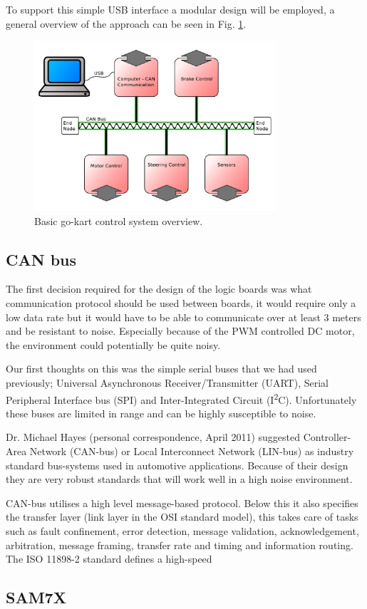 To support this simple USB interface a modular design will be employed, a
general overview of the approach can be seen in Fig. \ref{can-design}.

\begin{figure}
  \centering
  \includegraphics[width=0.8\textwidth]{../../Images/can_diagram.pdf}
  \caption{Basic go-kart control system overview.\label{can-design}}
\end{figure}

\subsection{CAN bus}

The first decision required for the design of the logic boards was what
communication protocol should be used between boards, it would require only a
low data rate but it would have to be able to communicate over at least 3 meters
and be resistant to noise.  Especially because of the PWM controlled DC motor,
the environment could potentially be quite noisy.

Our first thoughts on this was the simple serial buses that we had used
previously; Universal Asynchronous Receiver/Transmitter (UART), Serial
Peripheral Interface bus (SPI) and Inter-Integrated Circuit
(I\textsuperscript{2}C).  Unfortunately these buses are limited in range and can
be highly susceptible to noise.

Dr. Michael Hayes (personal correspondence, April 2011) suggested
Controller-Area Network (CAN-bus) or Local Interconnect Network (LIN-bus) as
industry standard bus-systems used in automotive applications.  Because of their
design they are very robust standards that will work well in a high noise
environment.

CAN-bus utilises a high level message-based protocol.  Below this it also
specifies the transfer layer (link layer in the OSI standard model), this takes
care of tasks such as fault confinement, error detection, message validation,
acknowledgement, arbitration, message framing, transfer rate and timing and
information routing.  The ISO 11898-2 standard defines a high-speed 

\subsection{SAM7X}


